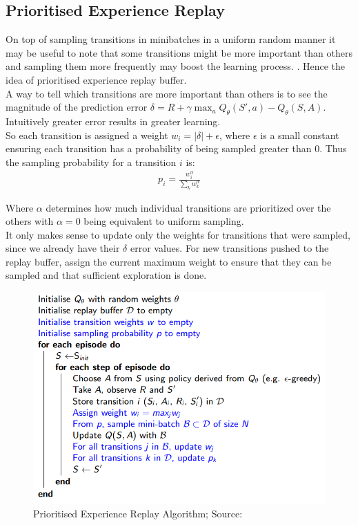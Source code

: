 \subsection{Prioritised Experience Replay}

On top of sampling transitions in minibatches in a uniform random manner it may be useful to note that some transitions might be more important than others and sampling them more frequently may boost the learning process. \cite{lecture_dqn}. Hence the idea of prioritised experience replay buffer. \\

A way to tell which transitions are more important than others is to see the magnitude of the prediction error $\delta = R + \gamma \max_a Q_{\theta}(S', a) - Q_{\theta}(S, A)$. 
Intuitively greater error results in greater learning.\\

So each transition is assigned a weight $w_i = |\delta| + \epsilon$, where $\epsilon$ is a small constant ensuring each transition has a probability of being sampled greater than 0. Thus the sampling probability for a transition $i$ is:
\begin{align}
    p_i = \frac{w_i^{\alpha}}{\sum_k w^{\alpha}_k}
\end{align}

Where $\alpha$ determines how much individual transitions are prioritized over the others with $\alpha = 0$ being equivalent to uniform sampling.\\

It only makes sense to update only the weights for transitions that were sampled, since we already have their $\delta$ error values\cite{lecture_dqn}. For new transitions pushed to the replay buffer, assign the current maximum weight to ensure that they can be sampled and that sufficient exploration is done.

\begin{figure}[H]
  \centering
  \includegraphics[scale=0.5]{figures/prioritized_buffer.PNG}
  \caption{Prioritised Experience Replay Algorithm; Source: \cite{lecture_dqn}}
  \label{fig:replay_buffer}
\end{figure}

